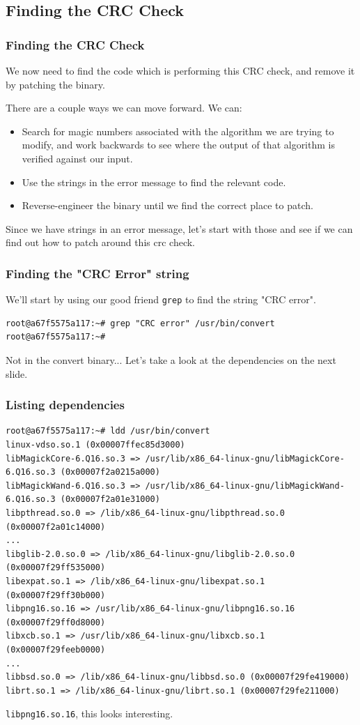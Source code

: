 \documentclass{beamer}
\begin{document}
\subsection{Finding the CRC Check}

\begin{frame}
\frametitle{Finding the CRC Check}
We now need to find the code which is performing this CRC check, and remove it
by patching the binary.
\par
There are a couple ways we can move forward. We can:

\begin{itemize}
  \item Search for magic numbers associated with the algorithm we are trying to
    modify, and work backwards to see where the output of that algorithm is
    verified against our input.
  \item Use the strings in the error message to find the relevant code.
  \item Reverse-engineer the binary until we find the correct place to patch.
\end{itemize}

Since we have strings in an error message, let's start with those and see if we
can find out how to patch around this crc check.
\end{frame}


\begin{frame}[fragile]
\frametitle{Finding the "CRC Error" string}
We'll start by using our good friend \texttt{grep} to find the string
"CRC error".

\begin{lstlisting}
root@a67f5575a117:~# grep "CRC error" /usr/bin/convert
root@a67f5575a117:~# 
\end{lstlisting}

Not in the convert binary... Let's take a look at the dependencies on the next
slide.
\end{frame}


\begin{frame}[fragile]
\frametitle{Listing dependencies}
\begin{lstlisting}[breaklines=false]
root@a67f5575a117:~# ldd /usr/bin/convert
linux-vdso.so.1 (0x00007ffec85d3000)
libMagickCore-6.Q16.so.3 => /usr/lib/x86_64-linux-gnu/libMagickCore-6.Q16.so.3 (0x00007f2a0215a000)
libMagickWand-6.Q16.so.3 => /usr/lib/x86_64-linux-gnu/libMagickWand-6.Q16.so.3 (0x00007f2a01e31000)
libpthread.so.0 => /lib/x86_64-linux-gnu/libpthread.so.0 (0x00007f2a01c14000)
...
libglib-2.0.so.0 => /lib/x86_64-linux-gnu/libglib-2.0.so.0 (0x00007f29ff535000)
libexpat.so.1 => /lib/x86_64-linux-gnu/libexpat.so.1 (0x00007f29ff30b000)
libpng16.so.16 => /usr/lib/x86_64-linux-gnu/libpng16.so.16 (0x00007f29ff0d8000)
libxcb.so.1 => /usr/lib/x86_64-linux-gnu/libxcb.so.1 (0x00007f29feeb0000)
...
libbsd.so.0 => /lib/x86_64-linux-gnu/libbsd.so.0 (0x00007f29fe419000)
librt.so.1 => /lib/x86_64-linux-gnu/librt.so.1 (0x00007f29fe211000)
\end{lstlisting}

\texttt{libpng16.so.16}, this looks interesting.
\end{frame}
\end{document}
